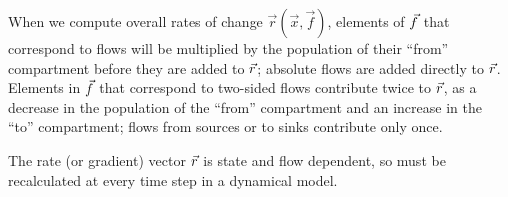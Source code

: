 
When we compute overall rates of change $\vec r(\vec x, \vec f)$, elements of $\vec{f}$ that correspond to \pc flows will be multiplied by the population of their ``from'' compartment before they are added to $\vec{r}$; absolute flows are added directly to $\vec{r}$. Elements in $\vec{f}$ that correspond to two-sided flows contribute twice to $\vec{r}$, as a decrease in the population of the ``from'' compartment and an increase in the ``to'' compartment; flows from sources or to sinks contribute only once.

The rate (or gradient) vector $\vec{r}$ is state and flow dependent, so must be recalculated at every time step in a dynamical model.

